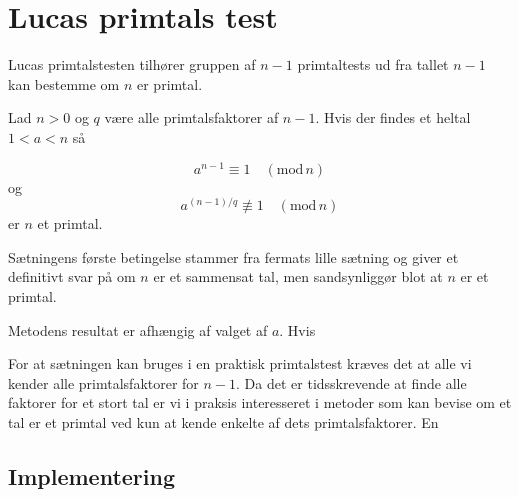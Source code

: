 
\section{Lucas primtals test}
Lucas primtalstesten tilhører gruppen af $n-1$ primtaltests ud fra
tallet $n-1$ kan bestemme om $n$ er primtal.

\begin{theorem}
  Lad $n > 0$ og $q$ være alle primtalsfaktorer af $n - 1$. Hvis der 
  findes et heltal $1 < a < n$ så

\begin{equation}
a^{n-1}\equiv 1 \quad (\text{mod}\,n)
\end{equation}
og
\begin{equation}
a^{(n-1)/q} \not\equiv 1\quad (\text{mod}\,n)
\end{equation}
er $n$ et primtal.

\end{theorem}

Sætningens første betingelse stammer fra fermats lille sætning og
giver et definitivt svar på om $n$ er et sammensat tal, men
sandsynliggør blot at $n$ er et primtal.

Metodens resultat er afhængig af valget af $a$. Hvis 

For at sætningen kan bruges i en praktisk primtalstest kræves det at
alle vi kender alle primtalsfaktorer for $n - 1$. Da det er
tidsskrevende at finde alle faktorer for et stort tal er vi i praksis
interesseret i metoder som kan bevise om et tal er et primtal ved kun
at kende enkelte af dets primtalsfaktorer. En 

\subsection{Implementering}





